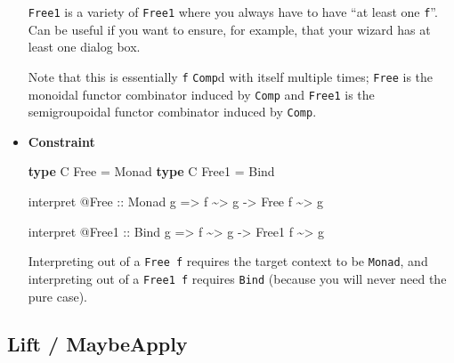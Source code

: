\documentclass[]{article}
\newenvironment{Shaded}{}{}
\newcommand{\DataTypeTok}[1]{\textcolor[rgb]{0.56,0.13,0.00}{#1}}
\newcommand{\KeywordTok}[1]{\textcolor[rgb]{0.00,0.44,0.13}{\textbf{#1}}}
\newcommand{\NormalTok}[1]{#1}
\newcommand{\OperatorTok}[1]{\textcolor[rgb]{0.40,0.40,0.40}{#1}}
\newcommand{\OtherTok}[1]{\textcolor[rgb]{0.00,0.44,0.13}{#1}}
\begin{document}
\begin{itemize}
  \texttt{Free1} is a variety of \texttt{Free1} where you always have to have
  ``at least one \texttt{f}''. Can be useful if you want to ensure, for example,
  that your wizard has at least one dialog box.

  Note that this is essentially \texttt{f} \texttt{Comp}d with itself multiple
  times; \texttt{Free} is the monoidal functor combinator induced by
  \texttt{Comp} and \texttt{Free1} is the semigroupoidal functor combinator
  induced by \texttt{Comp}.
\item
  \textbf{Constraint}

\begin{Shaded}
\begin{Highlighting}[]
\KeywordTok{type} \DataTypeTok{C} \DataTypeTok{Free}  \OtherTok{=} \DataTypeTok{Monad}
\KeywordTok{type} \DataTypeTok{C} \DataTypeTok{Free1} \OtherTok{=} \DataTypeTok{Bind}

\NormalTok{interpret }\OperatorTok{@}\DataTypeTok{Free}
\OtherTok{    ::} \DataTypeTok{Monad}\NormalTok{ g}
    \OtherTok{=>}\NormalTok{ f }\OperatorTok{\textasciitilde{}>}\NormalTok{ g}
    \OtherTok{{-}>} \DataTypeTok{Free}\NormalTok{ f }\OperatorTok{\textasciitilde{}>}\NormalTok{ g}

\NormalTok{interpret }\OperatorTok{@}\DataTypeTok{Free1}
\OtherTok{    ::} \DataTypeTok{Bind}\NormalTok{ g}
    \OtherTok{=>}\NormalTok{ f }\OperatorTok{\textasciitilde{}>}\NormalTok{ g}
    \OtherTok{{-}>} \DataTypeTok{Free1}\NormalTok{ f }\OperatorTok{\textasciitilde{}>}\NormalTok{ g}
\end{Highlighting}
\end{Shaded}

  Interpreting out of a \texttt{Free\ f} requires the target context to be
  \texttt{Monad}, and interpreting out of a \texttt{Free1\ f} requires
  \texttt{Bind} (because you will never need the pure case).
\end{itemize}

\hypertarget{lift-maybeapply}{%
\subsection{Lift / MaybeApply}\label{lift-maybeapply}}
\end{document}
